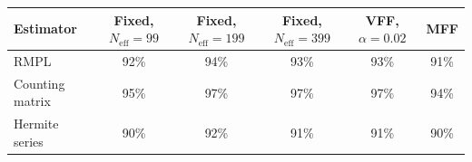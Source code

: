 \begin{tabular}{lccccc}
\toprule
Estimator & Fixed, $N_{\mathrm{eff}}=99$ & Fixed, $N_{\mathrm{eff}}=199$ & Fixed, $N_{\mathrm{eff}}=399$ & VFF, $\alpha=0.02$ & MFF \\
\midrule
RMPL & 92\% & 94\% & 93\% & 93\% & 91\% \\
Counting matrix & 95\% & 97\% & 97\% & 97\% & 94\% \\
Hermite series & 90\% & 92\% & 91\% & 91\% & 90\% \\
\bottomrule
\end{tabular}
